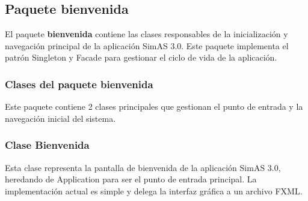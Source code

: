 \subsection{Paquete bienvenida}

El paquete \textbf{bienvenida} contiene las clases responsables de la inicialización y navegación principal de la aplicación SimAS 3.0. Este paquete implementa el patrón Singleton y Facade para gestionar el ciclo de vida de la aplicación.

\subsubsection{Clases del paquete bienvenida}

Este paquete contiene 2 clases principales que gestionan el punto de entrada y la navegación inicial del sistema.

\subsubsection{Clase Bienvenida}

Esta clase representa la pantalla de bienvenida de la aplicación SimAS 3.0, heredando de Application para ser el punto de entrada principal. La implementación actual es simple y delega la interfaz gráfica a un archivo FXML.

